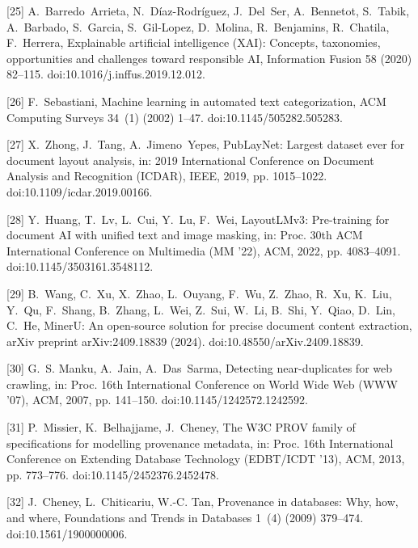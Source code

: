 \documentclass[11pt]{article}
\begin{document}
[25] 
A.~Barredo~Arrieta, N.~D{\'i}az-Rodr{\'i}guez, J.~Del~Ser, A.~Bennetot,
  S.~Tabik, A.~Barbado, S.~Garcia, S.~Gil-Lopez, D.~Molina, R.~Benjamins,
  R.~Chatila, F.~Herrera, Explainable artificial intelligence ({XAI}):
  Concepts, taxonomies, opportunities and challenges toward responsible {AI},
  Information Fusion 58 (2020) 82--115.
  doi:10.1016/j.inffus.2019.12.012.



[26] 
F.~Sebastiani, Machine learning in automated text categorization, ACM Computing
  Surveys 34~(1) (2002) 1--47.
  doi:10.1145/505282.505283.



[27] 
X.~Zhong, J.~Tang, A.~Jimeno~Yepes, {PubLayNet}: Largest dataset ever for
  document layout analysis, in: 2019 International Conference on Document
  Analysis and Recognition (ICDAR), IEEE, 2019, pp. 1015--1022.
  doi:10.1109/icdar.2019.00166.



[28] 
Y.~Huang, T.~Lv, L.~Cui, Y.~Lu, F.~Wei, {LayoutLMv3}: Pre-training for document
  {AI} with unified text and image masking, in: Proc. 30th ACM International
  Conference on Multimedia (MM '22), ACM, 2022, pp. 4083--4091.
  doi:10.1145/3503161.3548112.



[29] 
B.~Wang, C.~Xu, X.~Zhao, L.~Ouyang, F.~Wu, Z.~Zhao, R.~Xu, K.~Liu, Y.~Qu,
  F.~Shang, B.~Zhang, L.~Wei, Z.~Sui, W.~Li, B.~Shi, Y.~Qiao, D.~Lin, C.~He,
  {MinerU}: An open-source solution for precise document content extraction,
  arXiv preprint arXiv:2409.18839 (2024).
  doi:10.48550/arXiv.2409.18839.



[30] 
G.~S. Manku, A.~Jain, A.~Das~Sarma, Detecting near-duplicates for web crawling,
  in: Proc. 16th International Conference on World Wide Web (WWW '07), ACM,
  2007, pp. 141--150.
  doi:10.1145/1242572.1242592.



[31] 
P.~Missier, K.~Belhajjame, J.~Cheney, The {W3C} {PROV} family of specifications
  for modelling provenance metadata, in: Proc. 16th International Conference on
  Extending Database Technology (EDBT/ICDT '13), ACM, 2013, pp. 773--776.
  doi:10.1145/2452376.2452478.



[32] 
J.~Cheney, L.~Chiticariu, W.-C. Tan, Provenance in databases: Why, how, and
  where, Foundations and Trends in Databases 1~(4) (2009) 379--474.
  doi:10.1561/1900000006.
\end{document}
